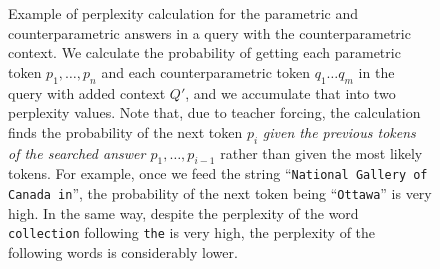\begin{figure}[p]

	\caption{Example of perplexity calculation for the parametric and counterparametric answers in a query with the counterparametric context. We calculate the probability of getting each parametric token $p_1, \dots, p_n$ and each counterparametric token $q_1 \dots q_m$ in the query with added context $Q'$, and we accumulate that into two perplexity values. Note that, due to teacher forcing, the calculation finds the probability of the next token $p_i$ \textit{given the previous tokens of the searched answer $p_1, \dots, p_{i - 1}$} rather than given the most likely tokens. For example, once we feed the string ``\texttt{National Gallery of Canada in}'', the probability of the next token being ``\texttt{Ottawa}'' is very high. In the same way, despite the perplexity of the word \texttt{collection} following \texttt{the} is very high, the perplexity of the following words is considerably lower.}
	\label{example_perplexity}
\end{figure}
